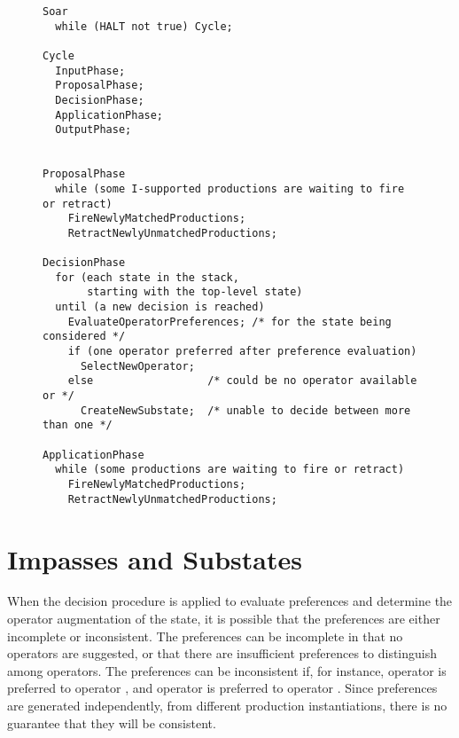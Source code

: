 \begin{figure}
\begin{verbatim}
Soar
  while (HALT not true) Cycle;
  
Cycle
  InputPhase;
  ProposalPhase;
  DecisionPhase;
  ApplicationPhase;
  OutputPhase;


ProposalPhase
  while (some I-supported productions are waiting to fire or retract)
    FireNewlyMatchedProductions;
    RetractNewlyUnmatchedProductions;

DecisionPhase
  for (each state in the stack, 
       starting with the top-level state)
  until (a new decision is reached)
    EvaluateOperatorPreferences; /* for the state being considered */
    if (one operator preferred after preference evaluation)
      SelectNewOperator;
    else                  /* could be no operator available or */
      CreateNewSubstate;  /* unable to decide between more than one */

ApplicationPhase
  while (some productions are waiting to fire or retract)
    FireNewlyMatchedProductions;
    RetractNewlyUnmatchedProductions;
\end{verbatim}

\label{fig:pseudocode}
\end{figure}

\section{Impasses and Substates}
\label{ARCH-impasses}

When the decision procedure is applied to evaluate preferences and determine
the operator augmentation of the state, it is possible that the preferences are 
either
incomplete or inconsistent.
The preferences can be incomplete in that no  operators are 
suggested, or that there are insufficient preferences to distinguish among
 operators. The preferences can be inconsistent if, for instance, 
operator
 is preferred to operator , and operator  is preferred 
to operator . Since preferences are generated independently,
from different production instantiations, there is no guarantee that
they will be consistent.


